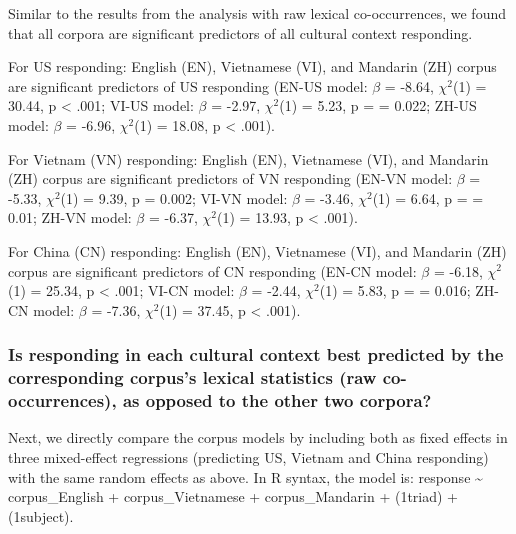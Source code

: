 \documentclass[10pt, letterpaper]{article}
\begin{document}
Similar to the results from the analysis with raw lexical
co-occurrences, we found that all corpora are significant predictors of
all cultural context responding.

For US responding: English (EN), Vietnamese (VI), and Mandarin (ZH)
corpus are significant predictors of US responding (EN-US model:
\(\beta\) = -8.64, \(\chi^2\)(1) = 30.44, p \textless{} .001; VI-US
model: \(\beta\) = -2.97, \(\chi^2\)(1) = 5.23, p = = 0.022; ZH-US
model: \(\beta\) = -6.96, \(\chi^2\)(1) = 18.08, p \textless{} .001).

For Vietnam (VN) responding: English (EN), Vietnamese (VI), and Mandarin
(ZH) corpus are significant predictors of VN responding (EN-VN model:
\(\beta\) = -5.33, \(\chi^2\)(1) = 9.39, p = 0.002; VI-VN model:
\(\beta\) = -3.46, \(\chi^2\)(1) = 6.64, p = = 0.01; ZH-VN model:
\(\beta\) = -6.37, \(\chi^2\)(1) = 13.93, p \textless{} .001).

For China (CN) responding: English (EN), Vietnamese (VI), and Mandarin
(ZH) corpus are significant predictors of CN responding (EN-CN model:
\(\beta\) = -6.18, \(\chi^2\)(1) = 25.34, p \textless{} .001; VI-CN
model: \(\beta\) = -2.44, \(\chi^2\)(1) = 5.83, p = = 0.016; ZH-CN
model: \(\beta\) = -7.36, \(\chi^2\)(1) = 37.45, p \textless{} .001).

\hypertarget{is-responding-in-each-cultural-context-best-predicted-by-the-corresponding-corpuss-lexical-statistics-raw-co-occurrences-as-opposed-to-the-other-two-corpora}{%
\subsubsection{\texorpdfstring{Is responding in each cultural context
\textbf{best} predicted by the corresponding corpus's lexical statistics
(raw co-occurrences), as opposed to the other two
corpora?}{Is responding in each cultural context best predicted by the corresponding corpus's lexical statistics (raw co-occurrences), as opposed to the other two corpora?}}\label{is-responding-in-each-cultural-context-best-predicted-by-the-corresponding-corpuss-lexical-statistics-raw-co-occurrences-as-opposed-to-the-other-two-corpora}}

Next, we directly compare the corpus models by including both as fixed
effects in three mixed-effect regressions (predicting US, Vietnam and
China responding) with the same random effects as above. In R syntax,
the model is: response \textasciitilde{} corpus\_English +
corpus\_Vietnamese + corpus\_Mandarin + (1\textbar triad) +
(1\textbar subject).
\end{document}
